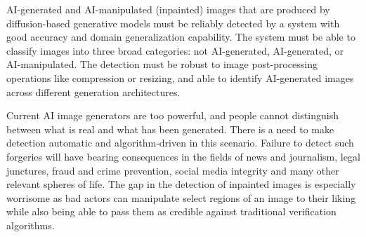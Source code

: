 AI-generated and AI-manipulated (inpainted) images that are produced
by diffusion-based generative models must be reliably detected by a
system with good accuracy and domain generalization capability. The
system must be able to classify images into three broad categories:
not AI-generated, AI-generated, or AI-manipulated. The detection must
be robust to image post-processing operations like compression or
resizing, and able to identify AI-generated images across different
generation architectures.

Current AI image generators are too powerful, and people cannot
distinguish between what is real and what has been generated. There
is a need to make detection automatic and algorithm-driven in this
scenario. Failure to detect such forgeries will have bearing
consequences in the fields of news and journalism, legal junctures,
fraud and crime prevention, social media integrity and many other
relevant spheres of life. The gap in the detection of inpainted
images is especially worrisome as bad actors can manipulate select
regions of an image to their liking while also being able to pass
them as credible against traditional verification algorithms.
